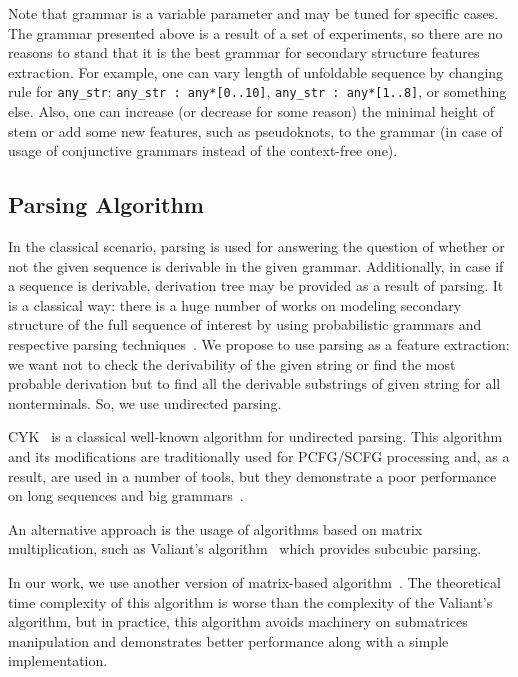 \documentclass[a4paper,twoside]{article}
\begin{document}
Note that grammar is a variable parameter and may be tuned for specific cases.
The grammar presented above is a result of a set of experiments, so there are no reasons to stand that it is the best grammar for secondary structure features extraction.
For example, one can vary length of unfoldable sequence by changing rule for \verb|any_str|: \verb|any_str : any*[0..10]|, \verb|any_str : any*[1..8]|, or something else.
Also, one can increase (or decrease for some reason) the minimal height of stem or add some new features, such as pseudoknots, to the grammar (in case of usage of conjunctive grammars instead of the context-free one).


\subsection{Parsing Algorithm}

\noindent In the classical scenario, parsing is used for answering the question of whether or not the given sequence is derivable in the given grammar.
Additionally, in case if a sequence is derivable, derivation tree may be provided as a result of parsing. 
It is a classical way: there is a huge number of works on modeling secondary structure of the full sequence of interest by using probabilistic grammars and respective parsing techniques~\cite{knudsen2003pfold,Browny1993StochasticCG,Knudsen2005StochasticCG}.
We propose to use parsing as a feature extraction: we want not to check the derivability of the given string or find the most probable derivation but to find all the derivable substrings of given string for all nonterminals.
So, we use undirected parsing.

CYK~\cite{Younger1967RecognitionAP} is a classical well-known algorithm for undirected parsing. 
This algorithm and its modifications are traditionally used for PCFG/SCFG processing and, as a result, are used in a number of tools, but they demonstrate a poor performance on long sequences and big grammars~\cite{Liu2005}.

An alternative approach is the usage of algorithms based on matrix multiplication, such as Valiant's algorithm~\cite{Valiant:1975:GCR:1739932.1740048} which provides subcubic parsing.

In our work, we use another version of matrix-based algorithm~\cite{Azimov:2018:CPQ:3210259.3210264}.
The theoretical time complexity of this algorithm is worse than the complexity of the Valiant's algorithm, but in practice, this algorithm avoids machinery on submatrices manipulation and demonstrates better performance along with a simple implementation.
\end{document}
